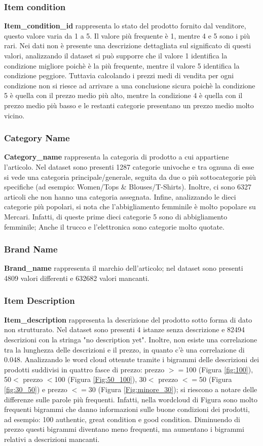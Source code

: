 \subsubsection{Item condition}
\textbf{Item\_condition\_id} rappresenta lo stato del prodotto fornito dal venditore, questo valore varia da 1 a 5.
Il valore più frequente è 1, mentre 4 e 5 sono i più rari. Nei dati non è presente una descrizione dettagliata sul significato di questi valori, analizzando il dataset si può supporre che il valore 1 identifica la condizione migliore poichè è la più frequente, mentre il valore 5 identifica la condizione peggiore. Tuttavia calcolando i prezzi medi di vendita per ogni condizione non si riesce ad arrivare a una conclusione sicura poichè la condizione 5 è quella con il prezzo medio più alto, mentre la condizione 4 è quella con il prezzo medio più basso e le restanti categorie presentano un prezzo medio molto vicino.
\subsubsection{Category Name}
\textbf{Category\_name} rappresenta la categoria di prodotto a cui appartiene l'articolo.
Nel dataset sono presenti 1287 categorie univoche e tra ognuna di esse si vede una categoria principale/generale, seguita da due o più sottocategorie più specifiche (ad esempio: Women/Tops \& Blouses/T-Shirts). Inoltre, ci sono 6327 articoli che non hanno una categoria assegnata.
Infine, analizzando le dieci categorie più popolari, si nota che l'abbigliamento femminile è molto popolare su Mercari. Infatti, di queste prime dieci categorie 5 sono di abbigliamento femminile; Anche il trucco e l'elettronica sono categorie molto quotate.
\subsubsection{Brand Name}
\textbf{Brand\_name} rappresenta il marchio dell'articolo; nel dataset sono presenti 4809 valori differenti e 632682 valori mancanti.
\subsubsection{Item Description}
\textbf{Item\_description} rappresenta la descrizione del prodotto sotto forma di dato non strutturato. Nel dataset sono presenti 4 istanze senza descrizione e 82494 descrizioni con la stringa "no description yet".
Inoltre, non esiste una correlazione tra la lunghezza delle descrizioni e il prezzo, in quanto c'è una correlazione di 0.048.
Analizzando le word cloud ottenute tramite i bigrammi delle descrizioni  dei prodotti suddivisi in quattro fasce di prezzo: prezzo $>=$100 (Figura \ref{fig:100}), 50$<$ prezzo $<$100 (Figura \ref{Fig:50_100}), 30$<$ prezzo $<=$50 (Figura \ref{fig:30_50}) e prezzo $<=30$ (Figura \ref{Fig:minore_30}); si riescono a notare delle differenze sulle parole più frequenti. Infatti, nella wordcloud di Figura sono molto frequenti bigrammi che danno informazioni sulle buone condizioni dei prodotti, ad esempio:  100 authentic, great condition e good condition.
Diminuendo di prezzo questi bigrammi diventano meno frequenti, ma aumentano i bigrammi relativi a descrizioni mancanti.

